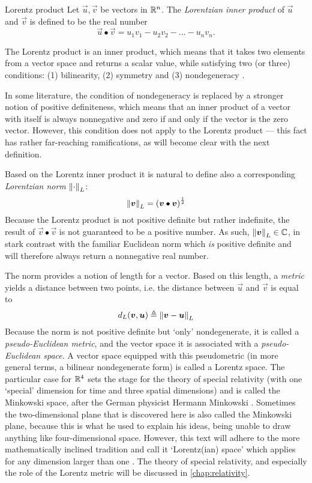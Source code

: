 \begin{thmblock}{Lorentz product}
    Let \(\vec{u}, \vec{v}\) be vectors in \(\mathbb{R}^n\). The \emph{Lorentzian inner product} of \(\vec{u}\) and \(\vec{v}\) is defined to be the real number
    \[
     \vec{u} \bullet \vec{v} = u_1v_1 - u_2v_2 - \ldots - u_nv_n.
\]
\end{thmblock}
The Lorentz product is an inner product, which means that it takes two elements from a vector space and returns a scalar value, while satisfying two (or three) conditions: (1) bilinearity, (2) symmetry and (3) nondegeneracy \cite{Ratcliffe2019}.

In some literature, the condition of nondegeneracy is replaced by a stronger notion of positive definiteness, which means that an inner product of a vector with itself is always nonnegative and zero if and only if the vector is the zero vector. However, this condition does not apply to the Lorentz product --- this fact has rather far-reaching ramifications, as will become clear with the next definition. 

Based on the Lorentz inner product it is natural to define also a corresponding \emph{Lorentzian norm} \(\norm{\cdot}_L\):
    \[
     \norm{\vb*{v}}_L = \qty(\vb*{v}\bullet\vb*{v})^\frac{1}{2}
\]
Because the Lorentz product is not positive definite but rather indefinite, the result of \(\vec{v}\bullet\vec{v}\) is not guaranteed to be a positive number. As such, \(\norm{\vb*{v}}_L \in \mathbb{C}\), in stark contrast with the familiar Euclidean norm which \emph{is} positive definite and will therefore always return a nonnegative real number.

The norm provides a notion of length for a vector. Based on this length, a \emph{metric} yields a distance between two points, i.e. the distance between \(\vec{u}\) and \(\vec{v}\) is equal to 
\[
     d_L(\vb*{v}, \vb*{u}) \triangleq \norm{\vb*{v} - \vb*{u}}_L
\] 
Because the norm is not positive definite but `only' nondegenerate, it is called a \emph{pseudo-Euclidean metric}, and the vector space it is associated with a \emph{pseudo-Euclidean space}. A vector space equipped with this pseudometric (in more general terms, a bilinear nondegenerate form) is called a Lorentz space. The particular case for \(\mathbb{R}^4\) sets the stage for the theory of special relativity (with one `special' dimension for time and three spatial dimensions) and is called the Minkowski space, after the German physicist Hermann Minkowski \cite{Catoni2008}. Sometimes the two-dimensional plane that is discovered here is also called the Minkowski plane, because this is what he used to explain his ideas, being unable to draw anything like four-dimensional space. However, this text will adhere to the more mathematically inclined tradition and call it `Lorentz(ian) space' which applies for any dimension larger than one \cite{Ratcliffe2019}. The theory of special relativity, and especially the role of the Lorentz metric will be discussed in \cref{chap:relativity}.

